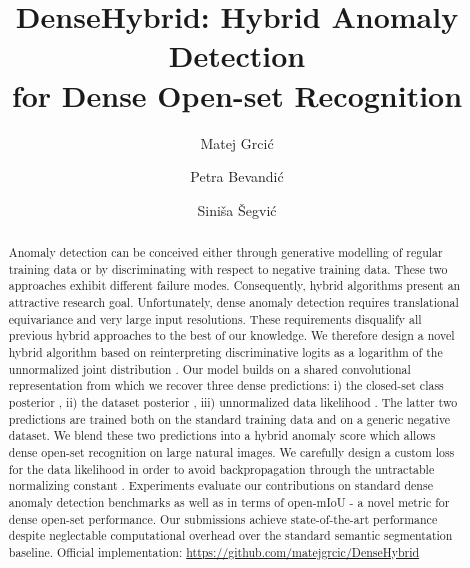 \documentclass[runningheads]{llncs}
\begin{document}
\pagestyle{headings}
\mainmatter
\def\ECCVSubNumber{6838}  

\title{DenseHybrid: Hybrid Anomaly Detection \\for Dense Open-set Recognition} 




\author{Matej Grcić \and
Petra Bevandić \and
Siniša Šegvić}
\maketitle
\begin{abstract}
Anomaly detection can be conceived
either through generative modelling
of regular training data
or by discriminating with respect
to negative training data.
These two approaches 
exhibit different failure modes.
Consequently, hybrid algorithms present 
an attractive research goal.
Unfortunately, dense anomaly detection requires
translational equivariance and
very large input resolutions.
These requirements disqualify
all previous hybrid approaches to the best of our knowledge.
We therefore design a novel hybrid algorithm
based on reinterpreting discriminative logits
as a logarithm of the unnormalized joint distribution .
Our model builds on a shared convolutional representation
from which we recover three dense predictions:
i) the closed-set class posterior ,
ii) the dataset posterior ,
iii) unnormalized data likelihood .
The latter two predictions are trained
both on the standard training data
and on a generic negative dataset.
We blend these two predictions
into a hybrid anomaly score
which allows dense open-set recognition
on large natural images.
We carefully design a custom loss
for the data likelihood
in order to avoid backpropagation
through the untractable
normalizing constant .
Experiments evaluate our contributions
on standard dense anomaly detection benchmarks
as well as in terms of open-mIoU -
a novel metric for dense open-set performance. 
Our submissions achieve state-of-the-art
performance despite neglectable computational overhead
over the standard semantic segmentation baseline.
Official implementation: \url{https://github.com/matejgrcic/DenseHybrid}
\end{abstract}
\end{document}
